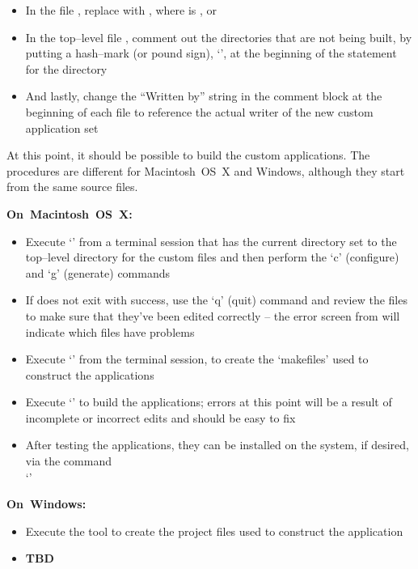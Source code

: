 \begin{itemize}
\item In the file , replace
 with ,
where  is ,  or 
\item In the top--level file , comment out the directories that are
not being built, by putting a hash--mark (or pound sign), `\asCode{\#}', at the beginning
of the  statement for the directory
\item And lastly, change the ``Written by'' string in the comment block at the beginning
of each file to reference the actual writer of the new custom application set
\end{itemize}
\tertiaryEnd{}
At this point, it should be possible to build the custom applications.
The procedures are different for Macintosh~OS~X and Windows, although they start from the
same source files. 
\begin{center}\textbf{On~Macintosh~OS~X:}\end{center}
\begin{itemize}
\item Execute `' from a terminal session that has the current directory
set to the top--level directory for the custom files and then perform the `c' (configure)
and `g' (generate) commands
\item If  does not exit with success, use the `q' (quit) command and review
the  files to make sure that they've been edited correctly -- the
error screen from  will indicate which files have problems
\item Execute `' from the terminal session, to create the `makefiles' used
to construct the applications
\item Execute `' to build the applications; errors at this point will be a
result of incomplete or incorrect edits and should be easy to fix
\item After testing the applications, they can be installed on the system, if desired, via
the command\\
`'
\end{itemize}
\begin{center}\textbf{On~Windows:}\end{center}
\begin{itemize}
\item Execute the tool  to create the project files used to construct the
application
\item \textbf{TBD}
\end{itemize}
